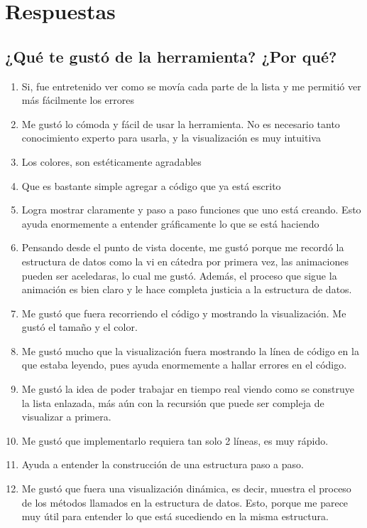 \chapter{Respuestas}
\label{anexo:comentarios}

\section{¿Qué te gustó de la herramienta? ¿Por qué?}

\begin{enumerate}
    \item Si, fue entretenido ver como se movía cada parte de la lista y me permitió ver más fácilmente los errores
    \item Me gustó lo cómoda y fácil de usar la herramienta. No es necesario tanto conocimiento experto para usarla, y la visualización es muy intuitiva
    \item Los colores, son estéticamente agradables
    \item Que es bastante simple agregar a código que ya está escrito
    \item Logra mostrar claramente y paso a paso funciones que uno está creando. Esto ayuda enormemente a entender gráficamente lo que se está haciendo
    \item Pensando desde el punto de vista docente, me gustó porque me recordó la estructura de datos como la vi en cátedra por primera vez, las animaciones pueden ser aceledaras, lo cual me gustó. Además, el proceso que sigue la animación es bien claro y le hace completa justicia a la estructura de datos.
    \item Me gustó que fuera recorriendo el código y mostrando la visualización. Me gustó el tamaño y el color.
    \item Me gustó mucho que la visualización fuera mostrando la línea de código en la que estaba leyendo, pues ayuda enormemente a hallar errores en el código.
    \item Me gustó la idea de poder trabajar en tiempo real viendo como se construye la lista enlazada, más aún con la recursión que puede ser compleja de visualizar a primera.
    \item Me gustó que implementarlo requiera tan solo 2 líneas, es muy rápido.
    \item Ayuda a entender la construcción de una estructura paso a paso.
    \item Me gustó que fuera una visualización dinámica, es decir, muestra el proceso de los métodos llamados en la estructura de datos. Esto, porque me parece muy útil para entender lo que está sucediendo en la misma estructura.
\end{enumerate}

